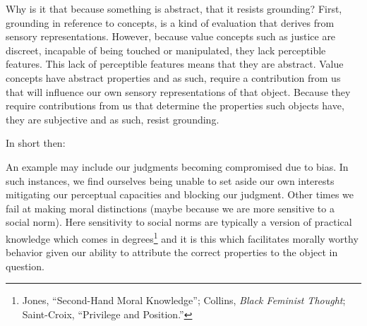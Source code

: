 \documentclass[phdthesis,12pt,final]{wuthesis}
\theoremstyle{definition}
\theoremstyle{definition}
\theoremstyle{definition}
\theoremstyle{definition}
\theoremstyle{remark}
\begin{document}
Why is it that because something is abstract, that it resists grounding? First, grounding in reference to concepts, is a kind of evaluation that derives from sensory representations. However, because value concepts such as justice are discreet, incapable of being touched or manipulated, they lack perceptible features. This lack of perceptible features means that they are abstract. Value concepts have abstract properties and as such, require a contribution from us that will influence our own sensory representations of that object. Because they require contributions from us that determine the properties such objects have, they are subjective and as such, resist grounding.

In short then:

\begin{Shaded}
\begin{Highlighting}[]

\end{Highlighting}
\end{Shaded}

\begin{Shaded}
\begin{Highlighting}[]

\end{Highlighting}
\end{Shaded}

\begin{Shaded}
\begin{Highlighting}[]

\end{Highlighting}
\end{Shaded}

An example may include our judgments becoming compromised due to bias. In such instances, we find ourselves being unable to set aside our own interests mitigating our perceptual capacities and blocking our judgment. Other times we fail at making moral distinctions (maybe because we are more sensitive to a social norm). Here sensitivity to social norms are typically a version of practical knowledge which comes in degrees\footnote{Jones, {``Second-{Hand Moral Knowledge}''}; Collins, \emph{Black Feminist Thought}; Saint-Croix, {``Privilege and {Position}.''}} and it is this which facilitates morally worthy behavior given our ability to attribute the correct properties to the object in question.
\end{document}
